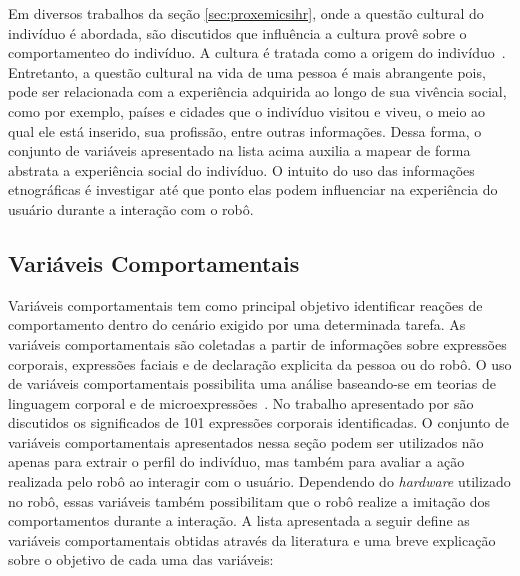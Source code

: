 Em diversos trabalhos da seção \ref{sec:proxemicsihr}, onde a questão cultural do indivíduo é abordada, são discutidos que influência a cultura provê sobre o comportamenteo do indivíduo. A cultura é tratada como a origem do indivíduo~\cite{eresha:2013}. Entretanto, a questão cultural na vida de uma pessoa é mais abrangente pois, pode ser relacionada com a experiência adquirida ao longo de sua vivência social, como por exemplo, países e cidades que o indivíduo visitou e viveu, o meio ao qual ele está inserido, sua profissão, entre outras informações. Dessa forma, o conjunto de variáveis apresentado na lista acima auxilia a mapear de forma abstrata a experiência social do indivíduo. O intuito do uso das informações etnográficas é investigar até que ponto elas podem influenciar na experiência do usuário durante a interação com o robô.

\subsection{Variáveis Comportamentais}
\label{sec:reacoes}
Variáveis comportamentais tem como principal objetivo identificar reações de comportamento dentro do cenário exigido por uma determinada tarefa. As variáveis comportamentais são coletadas a partir de informações sobre expressões corporais, expressões faciais e de declaração explicita da pessoa ou do robô. O uso de variáveis comportamentais possibilita uma análise baseando-se em teorias de linguagem corporal e de microexpressões~\cite{lambert:2008}. No trabalho apresentado por \textcite{lambert:2008} são discutidos os significados de 101 expressões corporais identificadas. O conjunto de variáveis comportamentais apresentados nessa seção podem ser utilizados não apenas para extrair o perfil do indivíduo, mas também para avaliar a ação realizada pelo robô ao interagir com o usuário. Dependendo do \emph{hardware} utilizado no robô, essas variáveis também possibilitam que o robô realize a imitação dos comportamentos durante a interação. A lista apresentada a seguir define as variáveis comportamentais obtidas através da literatura e uma breve explicação sobre o objetivo de cada uma das variáveis:

